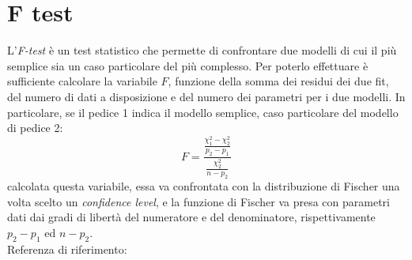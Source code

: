 \section{F test}
L'\textit{F-test} è un test statistico che permette di confrontare due modelli di cui il più semplice sia un caso particolare del più complesso. Per poterlo effettuare è sufficiente calcolare la variabile $F$, funzione della somma dei residui dei due fit, del numero di dati a disposizione e del numero dei parametri per i due modelli. In particolare, se il pedice 1 indica il modello semplice, caso particolare del modello di pedice 2:
\begin{equation}
\label{F-test}
 F = \frac{\frac{\chi^2_1-\chi^2_2}{p_2-p_1}}{\frac{\chi^2_2}{n-p_2}}
\end{equation}
calcolata questa variabile, essa va confrontata con la distribuzione di Fischer una volta scelto un \textit{confidence level}, e la funzione di Fischer va presa con parametri dati dai gradi di libertà del numeratore e del denominatore, rispettivamente $p_2-p_1$ ed $n-p_2$.\\
Referenza di riferimento: \cite{bib:F_test}

